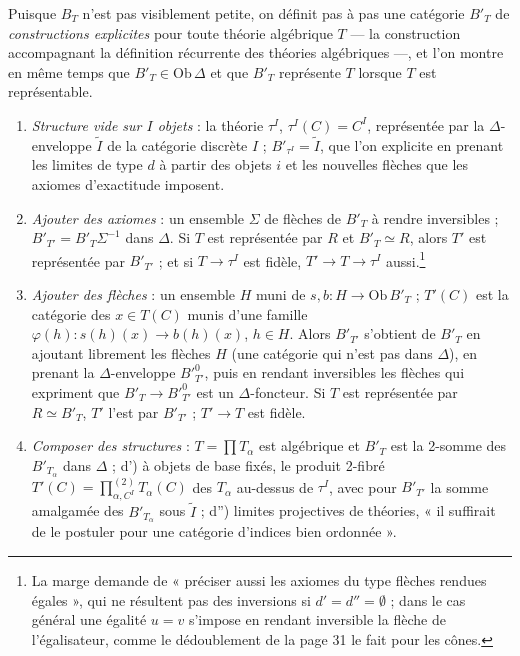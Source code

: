 \documentclass[11pt,a4paper]{article}
\begin{document}
Puisque $B_{T}$ n'est pas visiblement petite, on définit pas à pas une
catégorie $B'_{T}$ de \emph{constructions explicites} pour toute théorie
algébrique $T$ — la construction accompagnant la définition récurrente des
théories algébriques —, et l'on montre en même temps que $B'_{T} \in
\mathrm{Ob}\,\Delta$ et que $B'_{T}$ représente $T$ lorsque $T$ est
représentable.
\begin{enumerate}
\item[a)] \emph{Structure vide sur $I$ objets} : la théorie $\tau^{I}$,
$\tau^{I}(C) = C^{I}$, représentée par la $\Delta$-enveloppe $\widetilde{I}$
de la catégorie discrète $I$ ; $B'_{\tau^{I}} = \widetilde{I}$, que l'on
explicite en prenant les limites de type $d$ à partir des objets $i$ et les
nouvelles flèches que les axiomes d'exactitude imposent.
\item[b)] \emph{Ajouter des axiomes} : un ensemble $\Sigma$ de flèches de
$B'_{T}$ à rendre inversibles ; $B'_{T'} = B'_{T}\Sigma^{-1}$ dans $\Delta$.
Si $T$ est représentée par $R$ et $B'_{T} \simeq R$, alors $T'$ est
représentée par $B'_{T'}$ ; et si $T \to \tau^{I}$ est fidèle, $T' \to T
\to \tau^{I}$ aussi.\footnote{La marge demande de « préciser aussi les
axiomes du type flèches rendues égales », qui ne résultent pas des
inversions si $d' = d'' = \emptyset$ ; dans le cas général une égalité
$u = v$ s'impose en rendant inversible la flèche de l'égalisateur, comme
le dédoublement de la page 31 le fait pour les cônes.}
\item[c)] \emph{Ajouter des flèches} : un ensemble $H$ muni de $s, b : H
\to \mathrm{Ob}\,B'_{T}$ ; $T'(C)$ est la catégorie des $x \in T(C)$ munis
d'une famille $\varphi(h) : s(h)(x) \to b(h)(x)$, $h \in H$. Alors $B'_{T'}$
s'obtient de $B'_{T}$ en ajoutant librement les flèches $H$ (une catégorie
qui n'est pas dans $\Delta$), en prenant la $\Delta$-enveloppe $B'^{0}_{T'}$,
puis en rendant inversibles les flèches qui expriment que $B'_{T} \to
B'^{0}_{T'}$ est un $\Delta$-foncteur. Si $T$ est représentée par $R \simeq
B'_{T}$, $T'$ l'est par $B'_{T'}$ ; $T' \to T$ est fidèle.
\item[d)] \emph{Composer des structures} : $T = \prod T_{\alpha}$ est
algébrique et $B'_{T}$ est la 2-somme des $B'_{T_{\alpha}}$ dans $\Delta$ ;
d') à objets de base fixés, le produit 2-fibré $T'(C) = \prod^{(2)}_{\alpha,
C^{I}} T_{\alpha}(C)$ des $T_{\alpha}$ au-dessus de $\tau^{I}$, avec pour
$B'_{T'}$ la somme amalgamée des $B'_{T_{\alpha}}$ sous $\widetilde{I}$ ;
d'') limites projectives de théories, « il suffirait de le postuler pour
une catégorie d'indices bien ordonnée ».
\end{enumerate}
\end{document}
